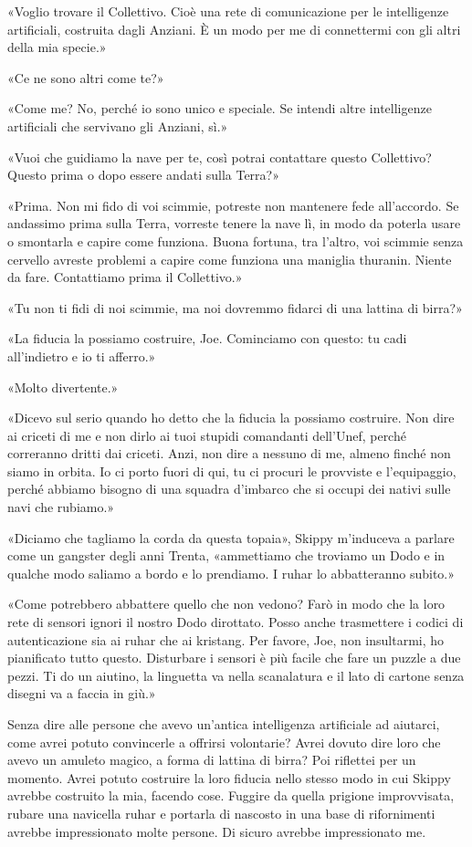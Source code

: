«Voglio trovare il Collettivo. Cioè una rete di comunicazione per le
intelligenze artificiali, costruita dagli Anziani. È un modo per me di
connettermi con gli altri della mia specie.»

«Ce ne sono altri come te?»

«Come me? No, perché io sono unico e speciale. Se intendi altre
intelligenze artificiali che servivano gli Anziani, sì.»

«Vuoi che guidiamo la nave per te, così potrai contattare questo
Collettivo? Questo prima o dopo essere andati sulla Terra?»

«Prima. Non mi fido di voi scimmie, potreste non mantenere fede
all'accordo. Se andassimo prima sulla Terra, vorreste tenere la nave lì,
in modo da poterla usare o smontarla e capire come funziona. Buona
fortuna, tra l'altro, voi scimmie senza cervello avreste problemi a
capire come funziona una maniglia thuranin. Niente da fare. Contattiamo
prima il Collettivo.»

«Tu non ti fidi di noi scimmie, ma noi dovremmo fidarci di una lattina
di birra?»

«La fiducia la possiamo costruire, Joe. Cominciamo con questo: tu cadi
all'indietro e io ti afferro.»

«Molto divertente.»

«Dicevo sul serio quando ho detto che la fiducia la possiamo costruire.
Non dire ai criceti di me e non dirlo ai tuoi stupidi comandanti
dell'Unef, perché correranno dritti dai criceti. Anzi, non dire a
nessuno di me, almeno finché non siamo in orbita. Io ci porto fuori di
qui, tu ci procuri le provviste e l'equipaggio, perché abbiamo bisogno
di una squadra d'imbarco che si occupi dei nativi sulle navi che
rubiamo.»

«Diciamo che tagliamo la corda da questa topaia», Skippy m'induceva a
parlare come un gangster degli anni Trenta, «ammettiamo che troviamo un
Dodo e in qualche modo saliamo a bordo e lo prendiamo. I ruhar lo
abbatteranno subito.»

«Come potrebbero abbattere quello che non vedono? Farò in modo che la
loro rete di sensori ignori il nostro Dodo dirottato. Posso anche
trasmettere i codici di autenticazione sia ai ruhar che ai kristang. Per
favore, Joe, non insultarmi, ho pianificato tutto questo. Disturbare i
sensori è più facile che fare un puzzle a due pezzi. Ti do un aiutino,
la linguetta va nella scanalatura e il lato di cartone senza disegni va
a faccia in giù.»

Senza dire alle persone che avevo un'antica intelligenza artificiale ad
aiutarci, come avrei potuto convincerle a offrirsi volontarie? Avrei
dovuto dire loro che avevo un amuleto magico, a forma di lattina di
birra? Poi riflettei per un momento. Avrei potuto costruire la loro
fiducia nello stesso modo in cui Skippy avrebbe costruito la mia,
facendo cose. Fuggire da quella prigione improvvisata, rubare una
navicella ruhar e portarla di nascosto in una base di rifornimenti
avrebbe impressionato molte persone. Di sicuro avrebbe impressionato me.

